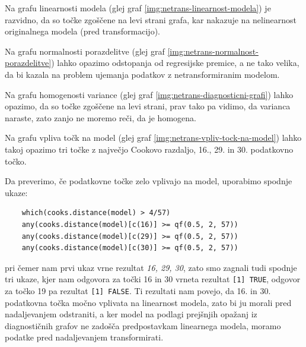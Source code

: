 Na grafu linearnosti modela (glej graf \ref{img:netrans-linearnost-modela}) je razvidno, da so točke zgoščene na levi
strani grafa, kar nakazuje na nelinearnost originalnega modela (pred transformacijo).

Na grafu normalnosti porazdelitve (glej graf \ref{img:netrans-normalnost-porazdelitve}) lahko opazimo odstopanja od
regresijske premice, a ne tako velika, da bi kazala na problem ujemanja podatkov z netransformiranim modelom.

Na grafu homogenosti variance (glej graf \ref{img:netrans-diagnosticni-grafi}) lahko opazimo, da so točke
zgoščene na levi strani, prav tako pa vidimo, da varianca naraste, zato zanjo ne moremo reči, da je homogena.

Na grafu vpliva točk na model (glej graf \ref{img:netrans-vpliv-tock-na-model}) lahko takoj opazimo tri točke z
največjo Cookovo razdaljo, 16., 29. in 30. podatkovno točko.

Da preverimo, če podatkovne točke zelo vplivajo na model, uporabimo spodnje ukaze:

\begin{verbatim}
    which(cooks.distance(model) > 4/57)
    any(cooks.distance(model)[c(16)] >= qf(0.5, 2, 57))
    any(cooks.distance(model)[c(29)] >= qf(0.5, 2, 57))
    any(cooks.distance(model)[c(30)] >= qf(0.5, 2, 57))
\end{verbatim}

pri čemer nam prvi ukaz vrne rezultat \emph{16, 29, 30}, zato smo zagnali tudi spodnje tri ukaze, kjer nam odgovora
za točki 16 in 30 vrneta rezultat \verb|[1] TRUE|, odgovor za točko 19 pa rezultat \verb|[1] FALSE|.
Ti rezultati nam povejo, da 16. in 30. podatkovna točka močno vplivata na linearnost modela, zato bi ju morali pred
nadaljevanjem odstraniti, a ker model na podlagi prejšnjih opažanj iz diagnostičnih grafov ne zadošča predpostavkam
linearnega modela, moramo podatke pred nadaljevanjem transformirati.

\newpage

